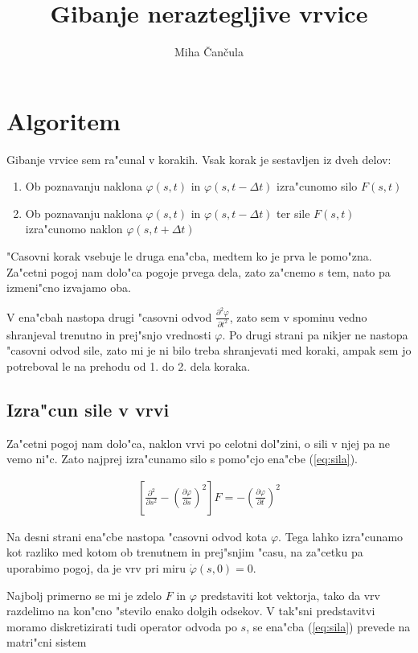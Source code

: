 \documentclass[a4paper,10pt]{article}
\title{Gibanje neraztegljive vrvice}
\author{Miha \v Can\v cula}
\renewcommand{\phi}{\varphi}
\newcommand{\parcialno}[2]{
  \frac{\partial #1}{\partial #2}
}
\newcommand{\parcdva}[2]{
  \frac{\partial^2 #1}{\partial #2 ^2}
}
\begin{document}
\maketitle

\section{Algoritem}

Gibanje vrvice sem ra"cunal v korakih. Vsak korak je sestavljen iz dveh delov:
\begin{enumerate}
 \item Ob poznavanju naklona $\phi(s,t)$ in $\phi(s,t-\Delta t)$ izra"cunomo silo $F(s,t)$
 \item Ob poznavanju naklona $\phi(s,t)$ in $\phi(s,t-\Delta t)$ ter sile $F(s,t)$ izra"cunomo naklon $\phi(s,t+\Delta t)$
\end{enumerate}

"Casovni korak vsebuje le druga ena"cba, medtem ko je prva le pomo"zna. Za"cetni pogoj nam dolo"ca pogoje prvega dela, zato za"cnemo s tem, nato pa izmeni"cno izvajamo oba. 

V ena"cbah nastopa drugi "casovni odvod $\parcdva{\phi}{t}$, zato sem v spominu vedno shranjeval trenutno in prej"snjo vrednosti $\phi$. Po drugi strani pa nikjer ne nastopa "casovni odvod sile, zato mi je ni bilo treba shranjevati med koraki, ampak sem jo potreboval le na prehodu od 1. do 2. dela koraka. 

\subsection{Izra"cun sile v vrvi}

Za"cetni pogoj nam dolo"ca, naklon vrvi po celotni dol"zini, o sili v njej pa ne vemo ni"c. Zato najprej izra"cunamo silo s pomo"cjo ena"cbe (\ref{eq:sila}). 

\begin{align}
 \label{eq:sila}
 \left[\parcdva{}{s} - \left(\parcialno{\phi}{s}\right)^2 \right]F = -\left(\parcialno{\phi}{t}\right)^2
\end{align}

Na desni strani ena"cbe nastopa "casovni odvod kota $\phi$. Tega lahko izra"cunamo kot razliko med kotom ob trenutnem in prej"snjim "casu, na za"cetku pa uporabimo pogoj, da je vrv pri miru $\dot \phi(s,0) = 0$. 

Najbolj primerno se mi je zdelo $F$ in $\phi$ predstaviti kot vektorja, tako da vrv razdelimo na kon"cno "stevilo enako dolgih odsekov. V tak"sni predstavitvi moramo diskretizirati tudi operator odvoda po $s$, se ena"cba (\ref{eq:sila}) prevede na matri"cni sistem
\end{document}
